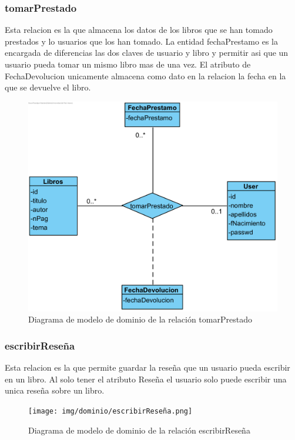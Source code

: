 ﻿\documentclass{report}
\begin{document}
                \subsubsection{tomarPrestado}
                    Esta relacion es la que almacena los datos de los libros que se han tomado prestados y lo usuarios que los han tomado. La entidad fechaPrestamo es la encargada de diferencias las dos claves de usuario y libro y permitir asi que un usuario pueda tomar un mismo libro mas de una vez. El atributo de FechaDevolucion unicamente almacena como dato en la relacion la fecha en la que se devuelve el libro.
                    \begin{figure}[H]
                        \centering
                        \includegraphics[width=1.0\textwidth]{img/dominio/tomarPrestado.png}
                        \caption{Diagrama de modelo de dominio de la relación tomarPrestado}
                    \end{figure}
                \clearpage
                \subsubsection{escribirReseña}
                    Esta relacion es la que permite guardar la reseña que un usuario pueda escribir en un libro. Al solo tener el atributo Reseña el usuario solo puede escribir una unica reseña sobre un libro.
                    \begin{figure}[H]
                        \centering
                        \texttt{[image: img/dominio/escribirReseña.png]}
                        \caption{Diagrama de modelo de dominio de la relación escribirReseña}
                    \end{figure}
                \clearpage
\end{document}
